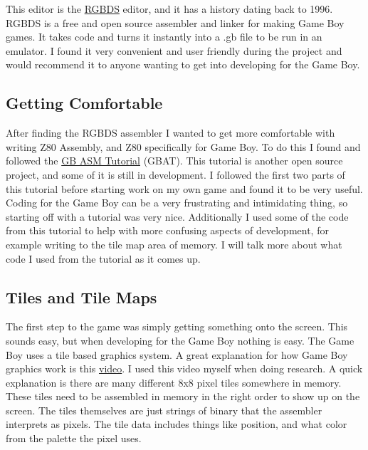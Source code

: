 \documentclass{article}
\begin{document}
This editor is the \href{https://rgbds.gbdev.io/}{RGBDS} editor, and it has a history dating back to 1996. RGBDS is a free and open source assembler and linker for making Game Boy games. It takes code and turns it instantly into a .gb file to be run in an emulator. I found it very convenient and user friendly during the project and would recommend it to anyone wanting to get into developing for the Game Boy.

\subsection{Getting Comfortable}

After finding the RGBDS assembler I wanted to get more comfortable with writing Z80 Assembly, and Z80 specifically for Game Boy. To do this I found and followed the \href{https://gbdev.io/gb-asm-tutorial/index.html}{GB ASM Tutorial} (GBAT). This tutorial is another open source project, and some of it is still in development. I followed the first two parts of this tutorial before starting work on my own game and found it to be very useful. Coding for the Game Boy can be a very frustrating and intimidating thing, so starting off with a tutorial was very nice. Additionally I used some of the code from this tutorial to help with more confusing aspects of development, for example writing to the tile map area of memory. I will talk more about what code I used from the tutorial as it comes up.

\subsection{Tiles and Tile Maps}

The first step to the game was simply getting something onto the screen. This sounds easy, but when developing for the Game Boy nothing is easy. The Game Boy uses a tile based graphics system. A great explanation for how Game Boy graphics work is this \href{https://www.youtube.com/watch?v=txkHN6izK2Y&t=120s}{video}. I used this video myself when doing research. A quick explanation is there are many different 8x8 pixel tiles somewhere in memory. These tiles need to be assembled in memory in the right order to show up on the screen. The tiles themselves are just strings of binary that the assembler interprets as pixels. The tile data includes things like position, and what color from the palette the pixel uses. 
\end{document}
